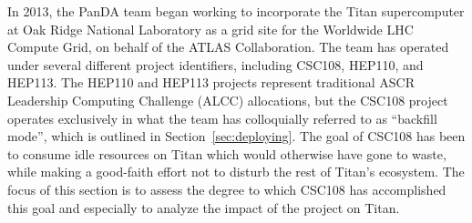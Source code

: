 
%
%


In 2013, the PanDA team began working to incorporate the Titan supercomputer at
Oak Ridge National Laboratory as a grid site for the Worldwide LHC Compute
Grid, on behalf of the ATLAS Collaboration. The team has operated under several
different project identifiers, including CSC108, HEP110, and HEP113. The HEP110
and HEP113 projects represent traditional ASCR Leadership Computing Challenge
(ALCC) allocations, but the CSC108 project operates exclusively in what the
team has colloquially referred to as ``backfill mode'', which is outlined in
Section~\ref{sec:deploying}. The goal of CSC108 has been to consume idle
resources on Titan which would otherwise have gone to waste, while making a
good-faith effort not to disturb the rest of Titan's ecosystem. The focus of
this section is to assess the degree to which CSC108 has accomplished this goal
and especially to analyze the impact of the project on Titan.



